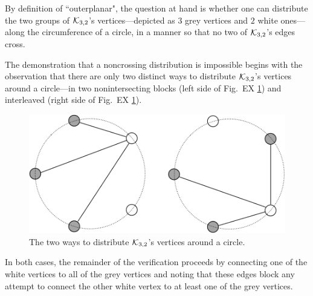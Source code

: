 \begin{itemize}
\smallskip

By definition of ``outerplanar", the question at hand is whether one can distribute the two groups of $\mbox{$\cal K$}_{3,2}$'s vertices---depicted as $3$ grey vertices and $2$ white ones---along the circumference of a circle, in a manner so that no two of $\mbox{$\cal K$}_{3,2}$'s edges cross.

\smallskip

The demonstration that a noncrossing distribution is impossible begins with the observation that there are only two distinct ways to distribute $\mbox{$\cal K$}_{3,2}$'s vertices around a circle---in two nonintersecting blocks (left side of Fig.~EX \ref{fig:outerplanarK32}) and interleaved (right side of Fig.~EX \ref{fig:outerplanarK32}).
\begin{figure}[h]
\begin{center}
        \includegraphics[scale=0.3]{FiguresGraph/outerplanarK3,2}
        \caption{The two ways to distribute $\mbox{$\cal K$}_{3,2}$'s vertices around a circle.}
        \label{fig:outerplanarK32}
\end{center}
\end{figure}
In both cases, the remainder of the verification proceeds by connecting one of the white vertices to all of the grey vertices and noting that these edges block any attempt to connect the other white vertex to at least one of the grey vertices.

\end{itemize}


